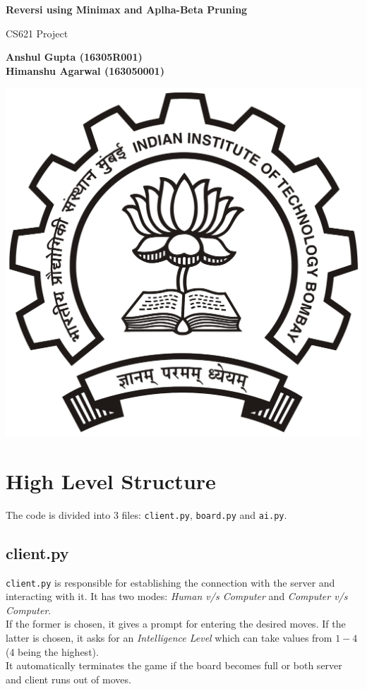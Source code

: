 \documentclass[a4paper,10pt]{article}
\begin{document}
\begin{titlepage}
\begin{center}
\vspace*{1cm}

\huge{\textbf{Reversi using Minimax and Aplha-Beta Pruning}}

\vspace{0.5cm}
CS621 Project

\vspace{1.5cm}

\Large{\textbf{Anshul Gupta (16305R001) \\ Himanshu Agarwal (163050001)}}

\vfill

\vspace{0.8cm}

\includegraphics[scale=0.05]{IITB.png}
\end{center}
\end{titlepage}
 
\section*{High Level Structure}
The code is divided into 3 files: \texttt{client.py}, \texttt{board.py} and \texttt{ai.py}.

\subsection*{client.py}
\texttt{client.py} is responsible for establishing the connection with the server and interacting with it. It has two modes: \textit{Human v/s Computer} and \textit{Computer v/s Computer}.\\[0.2cm]
If the former is chosen, it gives a prompt for entering the desired moves. If the latter is chosen, it asks for an \textit{Intelligence Level} which can take values from $1 - 4$ (4 being the highest).\\[0.2cm]
It automatically terminates the game if the board becomes full or both server and client runs out of moves.
\end{document}
